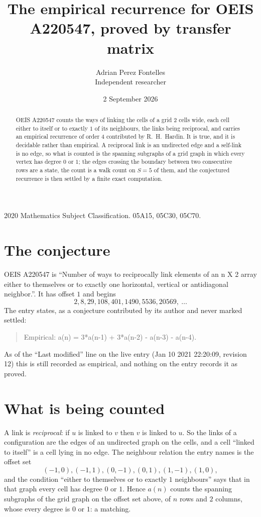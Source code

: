\documentclass[11pt,a4paper]{article}
\title{The empirical recurrence for OEIS A220547, proved by transfer matrix}
\author{Adrian Perez Fontelles\\ \small Independent researcher}
\date{2 September 2026}
\theoremstyle{plain}
\theoremstyle{definition}
\begin{document}
\maketitle

\begin{abstract}
OEIS A220547 counts the ways of linking the cells of a grid $2$ cells wide, each cell either to
itself or to exactly $1$ of its neighbours, the links being reciprocal, and carries an
empirical recurrence of order $4$ contributed by R.~H.~Hardin. It is true, and it is
decidable rather than empirical. A reciprocal link is an undirected edge and a self-link is
no edge, so what is counted is the spanning subgraphs of a grid graph in which every vertex
has degree $0$ or $1$; the edges crossing the boundary between two consecutive rows are a
state, the count is a walk count on $S=5$ of them, and the conjectured recurrence is then
settled by a finite exact computation.
\end{abstract}

\noindent\small 2020 Mathematics Subject Classification. 05A15, 05C30, 05C70.\normalsize

\section{The conjecture}

OEIS A220547 is ``Number of ways to reciprocally link elements of an n X 2 array either to themselves or to exactly one horizontal, vertical or antidiagonal neighbor.''. It has offset $1$ and begins
\[
2, 8, 29, 108, 401, 1490, 5536, 20569,\ \dots
\]
The entry states, as a conjecture contributed by its author and never marked settled:
\begin{quote}
Empirical: a(n) = 3*a(n-1) + 3*a(n-2) - a(n-3) - a(n-4).
\end{quote}
As of the ``Last modified'' line on the live entry (Jan 10 2021 22:20:09, revision 12) this is still
recorded as empirical, and nothing on the entry records it as proved.

\section{What is being counted}

A link is \emph{reciprocal}: if $u$ is linked to $v$ then $v$ is linked to $u$. So the links
of a configuration are the edges of an undirected graph on the cells, and a cell ``linked to
itself'' is a cell lying in no edge. The neighbour relation the entry names is the offset set
\[
(-1,0), (-1,1), (0,-1), (0,1), (1,-1), (1,0),
\]
and the condition ``either to themselves or to exactly $1$ neighbours'' says that in that
graph every cell has degree $0$ or $1$. Hence $a(n)$ counts the spanning subgraphs of the
grid graph on the offset set above, of $n$ rows and $2$ columns,
whose every degree is $0$ or $1$: a matching.
\end{document}
